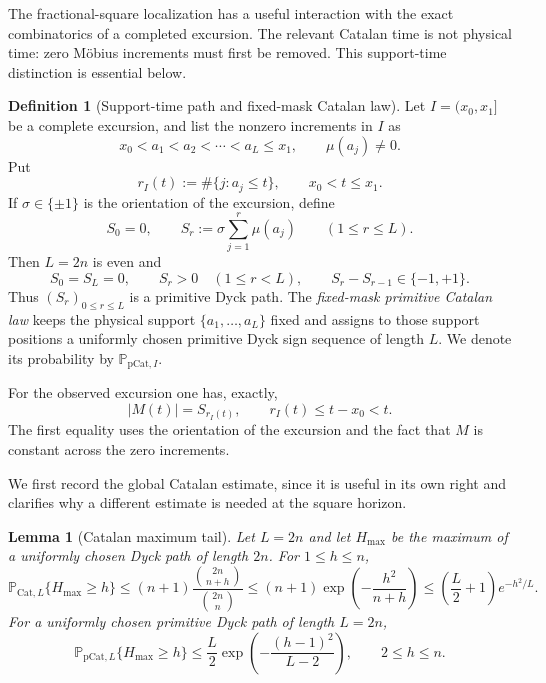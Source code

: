 \documentclass[11pt]{amsart}
\numberwithin{equation}{section}
\theoremstyle{plain}
\newtheorem{lemma}[theorem]{Lemma}
\theoremstyle{definition}
\newtheorem{definition}[theorem]{Definition}
\theoremstyle{remark}
\begin{document}
The fractional-square localization has a useful interaction with the exact
combinatorics of a completed excursion.  The relevant Catalan time is not
physical time: zero M\"obius increments must first be removed.  This
support-time distinction is essential below.

\begin{definition}[Support-time path and fixed-mask Catalan law]
\label{def:support-catalan}
Let $I=(x_0,x_1]$ be a complete excursion, and list the nonzero increments in
$I$ as
\[
 x_0<a_1<a_2<\cdots<a_L\le x_1,
 \qquad \mu(a_j)\ne0.
\]
Put
\[
 r_I(t):=\#\{j:a_j\le t\},\qquad x_0<t\le x_1.
\]
If $\sigma\in\{\pm1\}$ is the orientation of the excursion, define
\[
 S_0=0,\qquad
 S_r:=\sigma\sum_{j=1}^r\mu(a_j)\qquad(1\le r\le L).
\]
Then $L=2n$ is even and
\[
 S_0=S_L=0,\qquad S_r>0\quad(1\le r<L),\qquad
 S_r-S_{r-1}\in\{-1,+1\}.
\]
Thus $(S_r)_{0\le r\le L}$ is a primitive Dyck path.  The
\emph{fixed-mask primitive Catalan law} keeps the physical support
$\{a_1,\dots,a_L\}$ fixed and assigns to those support positions a uniformly
chosen primitive Dyck sign sequence of length $L$.  We denote its probability
by $\mathbb P_{\mathrm{pCat},I}$.
\end{definition}

For the observed excursion one has, exactly,
\begin{equation}
\label{eq:support-time-height}
 |M(t)|=S_{r_I(t)},
 \qquad
 r_I(t)\le t-x_0<t.
\end{equation}
The first equality uses the orientation of the excursion and the fact that
$M$ is constant across the zero increments.

We first record the global Catalan estimate, since it is useful in its own
right and clarifies why a different estimate is needed at the square
horizon.

\begin{lemma}[Catalan maximum tail]
\label{lem:catalan-max-tail}
Let $L=2n$ and let $H_{\max}$ be the maximum of a uniformly chosen Dyck path
of length $2n$.  For $1\le h\le n$,
\begin{equation}
\label{eq:catalan-max-tail}
 \mathbb P_{\mathrm{Cat},L}\{H_{\max}\ge h\}
 \le (n+1)\frac{\binom{2n}{n+h}}{\binom{2n}{n}}
 \le (n+1)\exp\!\left(-\frac{h^2}{n+h}\right)
 \le \left(\frac L2+1\right)e^{-h^2/L}.
\end{equation}
For a uniformly chosen primitive Dyck path of length $L=2n$,
\begin{equation}
\label{eq:primitive-catalan-max-tail}
 \mathbb P_{\mathrm{pCat},L}\{H_{\max}\ge h\}
 \le \frac L2\exp\!\left(-\frac{(h-1)^2}{L-2}\right),
 \qquad 2\le h\le n.
\end{equation}
\end{lemma}
\end{document}
